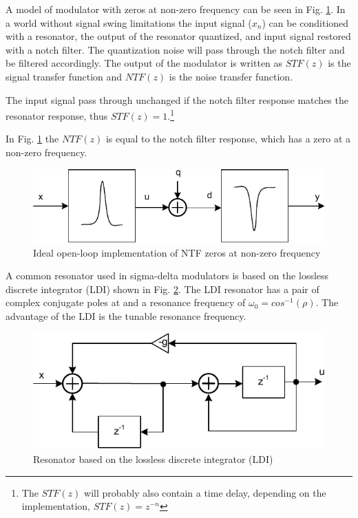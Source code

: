 A model of modulator with zeros at non-zero
frequency can be seen in Fig. \ref{sdrfig:sdrideal}. 
In a world
without signal swing limitations the input signal ($x_n$) can be conditioned
with a resonator, the output of the resonator quantized, and input
signal restored
with a notch filter. The quantization noise will pass through
the notch filter and be filtered accordingly. The output of the
modulator is written as
 $STF(z)$ is the signal
transfer function and $NTF(z)$ is the
noise transfer function. 

The input signal pass through
unchanged if the notch filter response matches
the resonator response, thus $STF(z) = 1$.\footnote{The $STF(z)$ will
  probably also contain a time delay, depending on the
  implementation, $STF(z) = z^{-n}$}

 In Fig.
\ref{sdrfig:sdrideal} the $NTF(z)$ is equal to the notch filter response,
which has
a zero at a non-zero frequency.

\begin{figure}[htbp]
\centerline{ \includegraphics[width=\myfigwidtha]{graphics/sdr_ideal}}
  \caption{Ideal open-loop implementation of NTF zeros at non-zero frequency}
  \label{sdrfig:sdrideal}
\end{figure}

A common resonator used in sigma-delta modulators is based on the lossless discrete
integrator (LDI) \cite{bruton75} shown in Fig. \ref{sdrfig:sdldi}. The
LDI resonator has
a pair of complex conjugate poles at 
and a resonance frequency of $\omega_0 = cos^{-1}(\rho)$. The
advantage of the LDI is the tunable resonance
frequency. 

\begin{figure}[htbp]
\centerline{ \includegraphics[width=\myfigwidthb]{graphics/sd_ldi}}
  \caption{Resonator based on the lossless discrete integrator (LDI)}
  \label{sdrfig:sdldi}
\end{figure}

